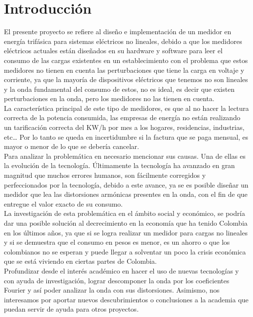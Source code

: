 \setcounter{page}{1}


\newpage{\cleardoublepage}
\chapter{Introducción}

El presente proyecto se refiere al diseño e implementación de un medidor en energía trifásica para sistemas eléctricos no lineales, debido a que los medidores eléctricos actuales están diseñados en su hardware y software para leer el consumo de las cargas existentes en un establecimiento con el problema que estos medidores no tienen en cuenta las perturbaciones que tiene la carga en voltaje y corriente, ya que la mayoría de dispositivos eléctricos que tenemos no son lineales y la onda fundamental del consumo de estos, no es ideal, es decir que existen perturbaciones en la onda, pero los medidores no las tienen en cuenta. \\

La característica principal de este tipo de medidores, es que al no hacer la lectura correcta de la potencia consumida, las empresas de energía no están realizando un tarificación correcta del KW/h por mes a los hogares, residencias, industrias, etc… Por lo tanto se queda en incertidumbre si la factura que se paga mensual, es mayor o menor de lo que se debería cancelar.\\

Para analizar la problemática en necesario mencionar sus causas. Una de ellas es la evolución de la tecnología. Últimamente la tecnología ha avanzado en gran magnitud que muchos errores humanos, son fácilmente corregidos y perfeccionados por la tecnología, debido a este avance, ya se es posible diseñar un medidor que lea las distorsiones armónicas presentes en la onda, con el fin de que entregue el valor exacto de su consumo.\\

La investigación de esta problemática en el ámbito social y económico, se podría dar una posible solución al decrecimiento en la economía que ha tenido Colombia en los últimos años, ya que si se logra realizar un medidor para cargas no lineales y si se demuestra que el consumo en pesos es menor, es un ahorro o que los colombianos no se esperan y puede llegar a solventar un poco la crisis económica que se está viviendo en ciertas partes de Colombia.\\

Profundizar desde el interés académico en hacer el uso de nuevas tecnologías y con ayuda de investigación, lograr descomponer la onda por los coeficientes Fourier y así poder analizar la onda con sus distorsiones. Asimismo, nos interesamos por aportar nuevos descubrimientos o conclusiones a la academia que puedan servir de ayuda para otros proyectos.\\

